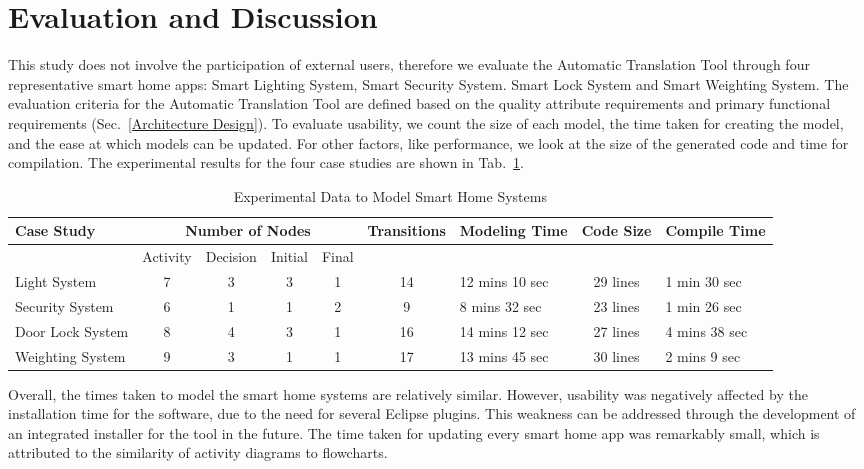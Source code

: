 \section{Evaluation and Discussion}
 


This study does not involve the participation of external users, therefore we evaluate the Automatic Translation Tool through four representative smart home apps: Smart Lighting System, Smart Security System. Smart Lock System and Smart Weighting System.
The evaluation criteria for the Automatic Translation Tool are defined based on the quality attribute requirements and primary functional requirements (Sec.~\ref{Architecture Design}). 
To evaluate usability, we count the size of each model, the time taken for creating the model, and the ease at which models can be updated. For other factors, like performance, we look at the size of the generated code and time for compilation. The experimental results for the four case studies are shown in Tab.~\ref{t4}.





\begin{table}[h!]
\scriptsize
\begin{center}
\begin{tabular}{|p{1.7cm}|c|c|c|c|c|p{1.5cm}|c|p{1.5cm}|} \hline
    \textbf{Case Study} & \multicolumn{4}{|c|}{\textbf{Number of Nodes}}&\textbf{Transitions} & \textbf{Modeling Time} & \textbf{Code Size}& \textbf{Compile Time} \\ \hline
    & Activity& Decision& Initial& Final& & & &\\ \hline
    Light System& 7& 3& 3& 1& 14& 12 mins 10 sec &29 lines& 1 min 30 sec\\ \hline
    Security System& 6& 1& 1& 2& 9& 8 mins 32 sec&23 lines &1 min 26 sec\\ \hline
    Door Lock System& 8& 4& 3& 1& 16& 14 mins 12 sec&27 lines& 4 mins 38 sec \\ \hline
    Weighting System& 9& 3& 1& 1& 17&13 mins 45 sec&30 lines& 2 mins 9 sec\\ \hline
\end{tabular} 
\end{center}
\caption{Experimental Data to Model Smart Home Systems}
\label{t4}
\end{table}


 
Overall, the times taken to model the smart home systems are relatively similar. However, usability was negatively affected by the installation time for the software, due to the need for several Eclipse plugins. This weakness can be addressed through the development of an integrated installer for the tool in the future.
The time taken for updating every smart home app was remarkably small, which is attributed to the similarity of activity diagrams to flowcharts. 

